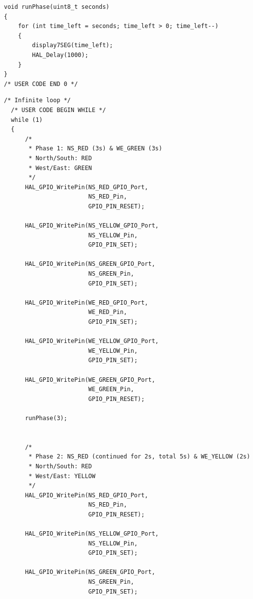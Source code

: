 \documentclass[oneside,final]{hcmut-report}
\begin{document}
\begin{lstlisting}[caption={[Countdown helper function runPhase()]{Countdown driver function runPhase() (Lab1\_e5/Core/Src/main.c)}},label={lst:ex5_runphase}]
void runPhase(uint8_t seconds)
{
    for (int time_left = seconds; time_left > 0; time_left--)
    {
        display7SEG(time_left);
        HAL_Delay(1000);
    }
}
/* USER CODE END 0 */
\end{lstlisting}

\clearpage
{}
\begin{lstlisting}[caption={[Integrated traffic countdown while loop]{Integrated traffic countdown while (1) loop (Lab1\_e5/Core/Src/main.c)}},label={lst:ex5_while},basicstyle=\fontsize{6.4pt}{7.2pt}\ttfamily,lineskip=0pt,aboveskip=1pt,belowskip=1pt]
  /* Infinite loop */
  /* USER CODE BEGIN WHILE */
  while (1)
  {
      /*
       * Phase 1: NS_RED (3s) & WE_GREEN (3s)
       * North/South: RED
       * West/East: GREEN
       */
      HAL_GPIO_WritePin(NS_RED_GPIO_Port,
                        NS_RED_Pin,
                        GPIO_PIN_RESET);

      HAL_GPIO_WritePin(NS_YELLOW_GPIO_Port,
                        NS_YELLOW_Pin,
                        GPIO_PIN_SET);

      HAL_GPIO_WritePin(NS_GREEN_GPIO_Port,
                        NS_GREEN_Pin,
                        GPIO_PIN_SET);

      HAL_GPIO_WritePin(WE_RED_GPIO_Port,
                        WE_RED_Pin,
                        GPIO_PIN_SET);

      HAL_GPIO_WritePin(WE_YELLOW_GPIO_Port,
                        WE_YELLOW_Pin,
                        GPIO_PIN_SET);

      HAL_GPIO_WritePin(WE_GREEN_GPIO_Port,
                        WE_GREEN_Pin,
                        GPIO_PIN_RESET);

      runPhase(3);


      /*
       * Phase 2: NS_RED (continued for 2s, total 5s) & WE_YELLOW (2s)
       * North/South: RED
       * West/East: YELLOW
       */
      HAL_GPIO_WritePin(NS_RED_GPIO_Port,
                        NS_RED_Pin,
                        GPIO_PIN_RESET);

      HAL_GPIO_WritePin(NS_YELLOW_GPIO_Port,
                        NS_YELLOW_Pin,
                        GPIO_PIN_SET);

      HAL_GPIO_WritePin(NS_GREEN_GPIO_Port,
                        NS_GREEN_Pin,
                        GPIO_PIN_SET);


\end{lstlisting}
\end{document}
